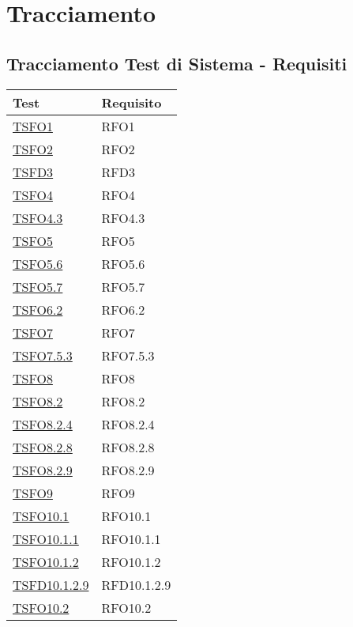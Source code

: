 \newpage
\section{Tracciamento}

\subsection{Tracciamento Test di Sistema - Requisiti}

\normalsize
\begin{longtable}{|>{\centering}m{5cm}|m{5cm}<{\centering}|}
	\hline \rowcolor{Gray}
	\textbf{Test} & \textbf{Requisito}\\
	\hline
	\endhead
	\hyperlink{TSFO1}{TSFO1} & RFO1\\ \hline
	\hyperlink{TSFO2}{TSFO2} & RFO2\\ \hline
	\hyperlink{TSFD3}{TSFD3} & RFD3\\ \hline
	\hyperlink{TSFO4}{TSFO4} & RFO4\\ \hline
	\hyperlink{TSFO4.3}{TSFO4.3} & RFO4.3\\ \hline
	\hyperlink{TSFO5}{TSFO5} & RFO5\\ \hline
	\hyperlink{TSFO5.6}{TSFO5.6} & RFO5.6\\ \hline
	\hyperlink{TSFO5.7}{TSFO5.7} & RFO5.7\\ \hline
	\hyperlink{TSFO6.2}{TSFO6.2} & RFO6.2\\ \hline
	\hyperlink{TSFO7}{TSFO7} & RFO7\\ \hline
	\hyperlink{TSFO7.5.3}{TSFO7.5.3} & RFO7.5.3\\ \hline
	\hyperlink{TSFO8}{TSFO8} & RFO8\\ \hline
	\hyperlink{TSFO8.2}{TSFO8.2} & RFO8.2\\ \hline
	\hyperlink{TSFO8.2.4}{TSFO8.2.4} & RFO8.2.4\\ \hline
	\hyperlink{TSFO8.2.8}{TSFO8.2.8} & RFO8.2.8\\ \hline
	\hyperlink{TSFO8.2.9}{TSFO8.2.9} & RFO8.2.9\\ \hline
	\hyperlink{TSFO9}{TSFO9} & RFO9\\ \hline
	\hyperlink{TSFO10.1}{TSFO10.1} & RFO10.1\\ \hline
	\hyperlink{TSFO10.1.1}{TSFO10.1.1} & RFO10.1.1\\ \hline
	\hyperlink{TSFO10.1.2}{TSFO10.1.2} & RFO10.1.2\\ \hline
	\hyperlink{TSFD10.1.2.9}{TSFD10.1.2.9} & RFD10.1.2.9\\ \hline
	\hyperlink{TSFO10.2}{TSFO10.2} & RFO10.2\\ \hline

\end{longtable}
